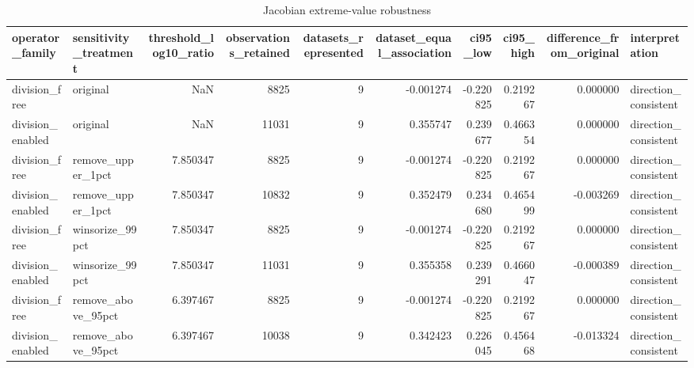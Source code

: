 \begin{table}
\caption{Jacobian extreme-value robustness}
\begin{tabular}{llrrrrrrrl}
\toprule
operator\_family & sensitivity\_treatment & threshold\_log10\_ratio & observations\_retained & datasets\_represented & dataset\_equal\_association & ci95\_low & ci95\_high & difference\_from\_original & interpretation \\
\midrule
division\_free & original & NaN & 8825 & 9 & -0.001274 & -0.220825 & 0.219267 & 0.000000 & direction\_consistent \\
division\_enabled & original & NaN & 11031 & 9 & 0.355747 & 0.239677 & 0.466354 & 0.000000 & direction\_consistent \\
division\_free & remove\_upper\_1pct & 7.850347 & 8825 & 9 & -0.001274 & -0.220825 & 0.219267 & 0.000000 & direction\_consistent \\
division\_enabled & remove\_upper\_1pct & 7.850347 & 10832 & 9 & 0.352479 & 0.234680 & 0.465499 & -0.003269 & direction\_consistent \\
division\_free & winsorize\_99pct & 7.850347 & 8825 & 9 & -0.001274 & -0.220825 & 0.219267 & 0.000000 & direction\_consistent \\
division\_enabled & winsorize\_99pct & 7.850347 & 11031 & 9 & 0.355358 & 0.239291 & 0.466047 & -0.000389 & direction\_consistent \\
division\_free & remove\_above\_95pct & 6.397467 & 8825 & 9 & -0.001274 & -0.220825 & 0.219267 & 0.000000 & direction\_consistent \\
division\_enabled & remove\_above\_95pct & 6.397467 & 10038 & 9 & 0.342423 & 0.226045 & 0.456468 & -0.013324 & direction\_consistent \\
\bottomrule
\end{tabular}
\end{table}
